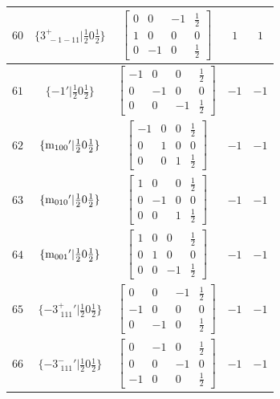 \documentclass[fleqn,8pt]{jsarticle}
\begin{document}
\begin{longtable}{ccccc}
$ 60 $ & $ \{3^{+}_{\,\,-1-11}|\frac{1}{2} 0 \frac{1}{2}\} $ & $ \begin{bmatrix} 0 & 0 & -1 & \frac{1}{2} \\ 1 & 0 & 0 & 0 \\ 0 & -1 & 0 & \frac{1}{2} \end{bmatrix} $ & $ 1 $ & $ 1 $ \\ \hline
$ 61 $ & $ \{-1{}'|\frac{1}{2} 0 \frac{1}{2}\} $ & $ \begin{bmatrix} -1 & 0 & 0 & \frac{1}{2} \\ 0 & -1 & 0 & 0 \\ 0 & 0 & -1 & \frac{1}{2} \end{bmatrix} $ & $ -1 $ & $ -1 $ \\ \hline
$ 62 $ & $ \{{\rm m}_{100}{}'|\frac{1}{2} 0 \frac{1}{2}\} $ & $ \begin{bmatrix} -1 & 0 & 0 & \frac{1}{2} \\ 0 & 1 & 0 & 0 \\ 0 & 0 & 1 & \frac{1}{2} \end{bmatrix} $ & $ -1 $ & $ -1 $ \\ \hline
$ 63 $ & $ \{{\rm m}_{010}{}'|\frac{1}{2} 0 \frac{1}{2}\} $ & $ \begin{bmatrix} 1 & 0 & 0 & \frac{1}{2} \\ 0 & -1 & 0 & 0 \\ 0 & 0 & 1 & \frac{1}{2} \end{bmatrix} $ & $ -1 $ & $ -1 $ \\ \hline
$ 64 $ & $ \{{\rm m}_{001}{}'|\frac{1}{2} 0 \frac{1}{2}\} $ & $ \begin{bmatrix} 1 & 0 & 0 & \frac{1}{2} \\ 0 & 1 & 0 & 0 \\ 0 & 0 & -1 & \frac{1}{2} \end{bmatrix} $ & $ -1 $ & $ -1 $ \\ \hline
$ 65 $ & $ \{-3^{+}_{\,\,111}{}'|\frac{1}{2} 0 \frac{1}{2}\} $ & $ \begin{bmatrix} 0 & 0 & -1 & \frac{1}{2} \\ -1 & 0 & 0 & 0 \\ 0 & -1 & 0 & \frac{1}{2} \end{bmatrix} $ & $ -1 $ & $ -1 $ \\ \hline
$ 66 $ & $ \{-3^{-}_{\,\,111}{}'|\frac{1}{2} 0 \frac{1}{2}\} $ & $ \begin{bmatrix} 0 & -1 & 0 & \frac{1}{2} \\ 0 & 0 & -1 & 0 \\ -1 & 0 & 0 & \frac{1}{2} \end{bmatrix} $ & $ -1 $ & $ -1 $ \\ \hline

\end{longtable}
\end{document}
